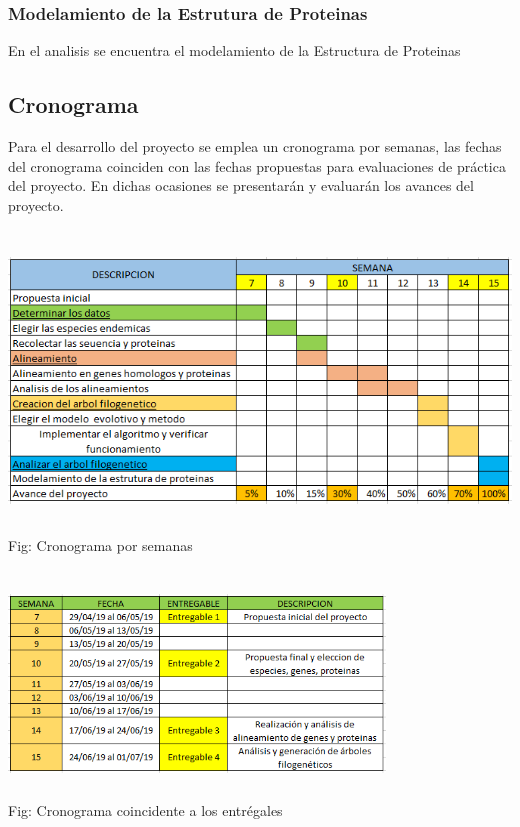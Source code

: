 \documentclass[a4paper]{article}
\begin{document}
\subsubsection{Modelamiento de la Estrutura de Proteinas}
En el analisis se encuentra el modelamiento de la Estructura de Proteinas

\subsection{Cronograma}
Para el desarrollo del proyecto se emplea un cronograma por semanas, las fechas del cronograma coinciden con las fechas propuestas para evaluaciones de práctica del proyecto. En dichas ocasiones se presentarán y evaluarán los avances del proyecto.

\begin{center}
	\includegraphics[width=14cm,height=8cm]{cronoextendido.png}\\
	Fig: Cronograma por semanas	
\end{center}

\begin{center}
	\includegraphics[width=10cm,height=6cm]{cronoentregrable.png}\\
	Fig: Cronograma coincidente a los entrégales
\end{center}
\end{document}

